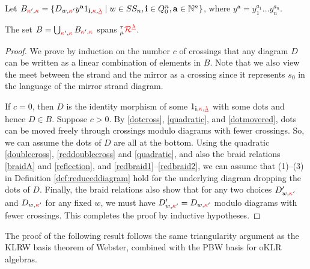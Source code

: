 Let 
$B_{{\color{red}\kappa}',{\color{red}\kappa}}=\{ D_{w,{\color{red}\kappa}'}y^\mathbf a1_{\mathbf{i}, {\color{red}\kappa},{{\color{red}\underline{\lambda}}}} \mid w\in SS_n, \mathbf{i}\in Q_0^n, \mathbf a\in \mathbb{N}^n \}$, 
where $y^\mathbf a=y_1^{a_1}\ldots y_n^{a_n}$.

\begin{lemma}
\label{lem:spanpart}
    The set $B=\bigcup_{{\color{red}\kappa}',{\color{red}\kappa}}B_{{\color{red}\kappa}',{\color{red}\kappa}}$ 
    spans ${}^\tau_\mu{{{\color{red}\mathcal{R}}}}^{{{\color{red}\underline{\lambda}}}}$.
\end{lemma}
\begin{proof}
We prove by induction on the number $c$ of crossings that any diagram $D$ can be written as a linear combination of elements in $B$. Note that we also view the meet between the strand and the mirror as a crossing since it represents $s_0$ in the language of the mirror strand diagram. 

If $c=0$, then $D$ is the identity morphism of some $1_{\mathbf{i},{\color{red}\kappa},{{\color{red}\underline{\lambda}}}} $ with some dots and hence $D\in B$. Suppose $c>0$.
By \eqref{dotcross}, \eqref{quadratic}, and \eqref{dotmovered}, dots can be moved freely through crossings modulo diagrams with fewer crossings. So, we can assume  the dots of $D$ are all at the bottom.  
Using the quadratic \eqref{doublecross}, \eqref{reddoublecross} and \eqref{quadratic}, and also 
 the braid  relations \eqref{braidA} and \eqref{reflection}, and \eqref{redbraid1}--\eqref{redbraid2},  we can assume that  
(1)--(3) in Definition \ref{def:reduceddiagram} hold for the underlying diagram dropping the dots of $D$. Finally, the braid relations also show that for any two choices $D'_{w,{\color{red}\kappa}'}$ and $D_{w,{\color{red}\kappa}'}$ for any  fixed $w$, we must have $D '_{w,{\color{red}\kappa}'}=D_{w,{\color{red}\kappa}'} $  modulo diagrams with fewer crossings. This completes the proof by inductive hypotheses.
\end{proof}

The proof of the following result follows the same triangularity argument as the KLRW basis theorem of Webster, combined with the PBW basis for oKLR algebras.

